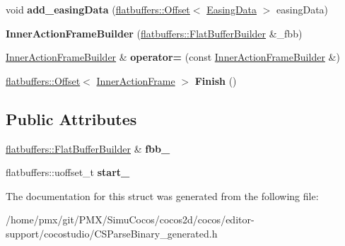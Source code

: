 \begin{DoxyCompactItemize}
void {\bfseries add\+\_\+easing\+Data} (\hyperlink{structflatbuffers_1_1Offset}{flatbuffers\+::\+Offset}$<$ \hyperlink{structflatbuffers_1_1EasingData}{Easing\+Data} $>$ easing\+Data)
\item 
\mbox{\label{structflatbuffers_1_1InnerActionFrameBuilder_a2f161850e4a7219641bb8ca85e0301c0}} 
{\bfseries Inner\+Action\+Frame\+Builder} (\hyperlink{classflatbuffers_1_1FlatBufferBuilder}{flatbuffers\+::\+Flat\+Buffer\+Builder} \&\+\_\+fbb)
\item 
\mbox{\label{structflatbuffers_1_1InnerActionFrameBuilder_a55e0a9436a87e68f52b79703cb81d224}} 
\hyperlink{structflatbuffers_1_1InnerActionFrameBuilder}{Inner\+Action\+Frame\+Builder} \& {\bfseries operator=} (const \hyperlink{structflatbuffers_1_1InnerActionFrameBuilder}{Inner\+Action\+Frame\+Builder} \&)
\item 
\mbox{\label{structflatbuffers_1_1InnerActionFrameBuilder_a8e517c89a1f39b0404d164ab22e33e06}} 
\hyperlink{structflatbuffers_1_1Offset}{flatbuffers\+::\+Offset}$<$ \hyperlink{structflatbuffers_1_1InnerActionFrame}{Inner\+Action\+Frame} $>$ {\bfseries Finish} ()
\end{DoxyCompactItemize}
\subsection*{Public Attributes}
\begin{DoxyCompactItemize}
\item 
\mbox{\label{structflatbuffers_1_1InnerActionFrameBuilder_ab9c418098c9bc4ab2715206687fcb8aa}} 
\hyperlink{classflatbuffers_1_1FlatBufferBuilder}{flatbuffers\+::\+Flat\+Buffer\+Builder} \& {\bfseries fbb\+\_\+}
\item 
\mbox{\label{structflatbuffers_1_1InnerActionFrameBuilder_af3220789a4dae0714754c3196f699ad7}} 
flatbuffers\+::uoffset\+\_\+t {\bfseries start\+\_\+}
\end{DoxyCompactItemize}


The documentation for this struct was generated from the following file\+:\begin{DoxyCompactItemize}
\item 
/home/pmx/git/\+P\+M\+X/\+Simu\+Cocos/cocos2d/cocos/editor-\/support/cocostudio/C\+S\+Parse\+Binary\+\_\+generated.\+h\end{DoxyCompactItemize}
